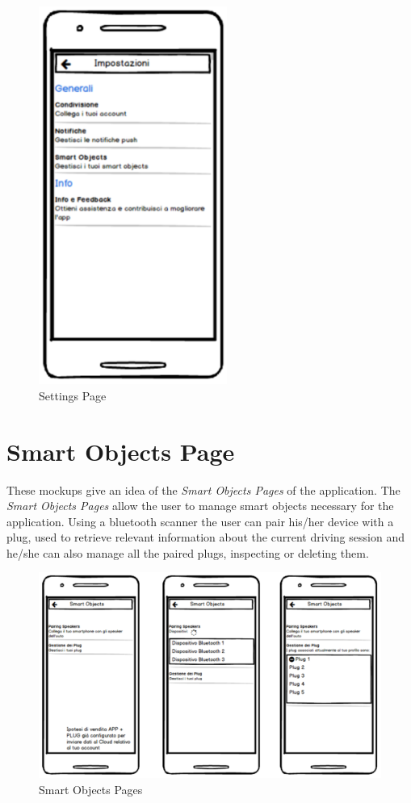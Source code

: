 \begin{figure}[htbp]
	\centering
	\begin{minipage}[b]{0.9\textwidth}
		\includegraphics[width=0.55\textwidth]{cpt/img/SettingsPage.png}
		\caption{Settings Page}
	\end{minipage}
\end{figure}

\clearpage
\section{Smart Objects Page}
These mockups give an idea of the \textit{Smart Objects Pages} of the application. The \textit{Smart Objects Pages} allow the user to manage smart objects necessary for the application. Using a bluetooth scanner the user can pair his/her device with a plug, used to retrieve relevant information about the current driving session and he/she can also manage all the paired plugs, inspecting or deleting them.\\

\begin{figure}[htbp]
\centering
\includegraphics[width=\textwidth]{cpt/img/SmartObjectsPage.png}
\caption{Smart Objects Pages}
\end{figure}